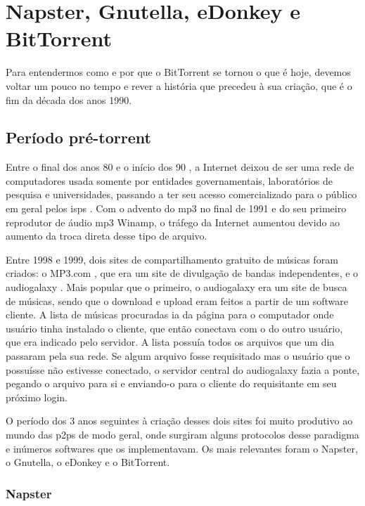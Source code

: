 
\chapter{Napster, Gnutella, eDonkey e BitTorrent}

Para entendermos como e por que o BitTorrent se tornou o que é hoje, devemos voltar um
pouco no tempo e rever a história que precedeu à sua criação, que é o fim da década dos
anos 1990.

\section{Período pré-torrent}

Entre o final dos anos 80 e o início dos 90 \cite{wiki:fs,wiki:fs-timeline}, a
Internet deixou de ser uma rede de computadores usada somente por entidades
governamentais, laboratórios de pesquisa e universidades, passando a ter seu acesso
comercializado para o público em geral pelos \glspl{isp} \cite{wiki:isp}. Com o
advento do \gls{mp3} \cite{wiki:mp3} no final de 1991 e do seu primeiro reprodutor
de áudio \gls*{mp3} Winamp, o tráfego da Internet aumentou devido ao aumento da troca
direta desse tipo de arquivo.

Entre 1998 e 1999, dois sites de compartilhamento gratuito de músicas foram criados: o
MP3.com \cite{wiki:mp3.com}, que era um site de divulgação de bandas independentes,
e o \gls{audiogalaxy} \cite{wiki:audiogalaxy.com,revista:pnp}. Mais popular que o
primeiro, o \gls*{audiogalaxy} era um site de busca de músicas, sendo que o download e
upload eram feitos a partir de um software cliente. A lista de músicas procuradas ia da
página para o computador onde usuário tinha instalado o cliente, que então conectava
com o do outro usuário, que era indicado pelo servidor. A lista possuía todos os
arquivos que um dia passaram pela sua rede. Se algum arquivo fosse requisitado mas o
usuário que o possuísse não estivesse conectado, o servidor central do
\gls*{audiogalaxy} fazia a ponte, pegando o arquivo para si e enviando-o para o cliente
do requisitante em seu próximo login.

O período dos 3 anos seguintes à criação desses dois sites foi muito produtivo ao
mundo das \glspl{p2p} de modo geral, onde surgiram alguns protocolos desse paradigma e
inúmeros softwares que os implementavam. Os mais relevantes foram o Napster, o Gnutella,
o eDonkey e o BitTorrent.

\subsection{Napster}


